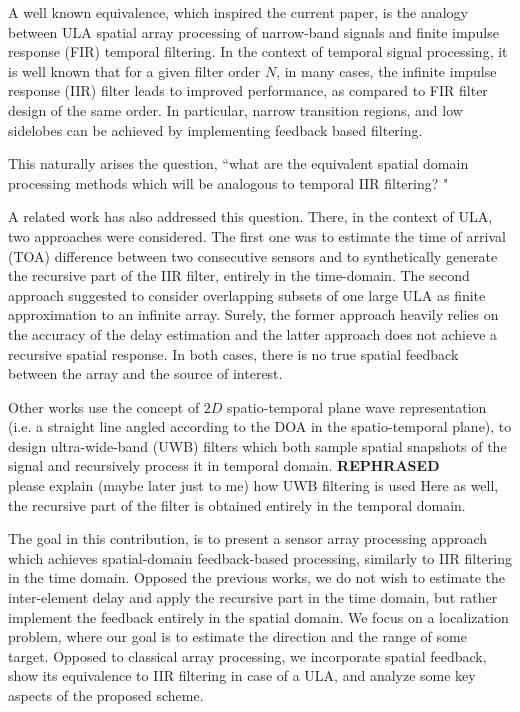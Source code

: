 \documentclass[conference]{IEEEtran}
\begin{document}
\par A well known \cite{VanVeenBeamforming:Filtering} equivalence, which inspired the current paper, is the analogy between ULA spatial array processing of narrow-band signals and finite impulse response (FIR) temporal filtering. 
In the context of temporal signal processing, it is well known that for a given filter order $N$, in many cases, the infinite impulse response (IIR) filter leads to improved performance, as compared to FIR filter design of the same order. In particular, narrow transition regions, and low sidelobes can be achieved by implementing feedback based filtering. 
\par This naturally arises the question, ``what are the equivalent spatial domain processing methods which will be analogous to temporal IIR filtering? " 
\par A related work \cite{Wen2013ExtendingStructure} has also addressed this question. 
There, in the context of ULA, two approaches were considered. 
The first one was to estimate the time of arrival (TOA) difference between two consecutive sensors and to synthetically generate the recursive part of the IIR filter, entirely in the time-domain. 
The second approach suggested to consider overlapping subsets of one large ULA as finite approximation to an infinite array. Surely, the former approach heavily relies on the accuracy of the delay estimation and the latter approach does not achieve a recursive spatial response. In both cases, there is no true spatial feedback between the array and the source of interest.
\par Other works \cite{Madanayake2008AFilters,Madanayake2008ABeamformer} use the concept of $2D$ spatio-temporal plane wave representation (i.e. a straight line angled according to the DOA in the spatio-temporal plane), to design ultra-wide-band (UWB) filters \cite{L.Bruton1983HighlyPlanes} which both sample spatial snapshots of the signal and recursively process it in temporal domain.  {\textbf{REPHRASED}\\please explain (maybe later just to me) how UWB filtering is used}
Here as well, the recursive part of the filter is obtained entirely in the temporal domain.  
\par The goal in this contribution, is to present a sensor array processing approach which achieves spatial-domain feedback-based processing, similarly to IIR filtering in the time domain. Opposed the previous works, we do not wish to estimate the inter-element delay and apply the recursive part in the time domain, but rather implement the feedback entirely in the spatial domain.
We focus on a localization problem, where our goal is to estimate the direction and the range of some target.
Opposed to classical array processing, we incorporate spatial feedback, show its equivalence to IIR filtering in case of a ULA, and analyze some key aspects of the proposed scheme. 
\end{document}

